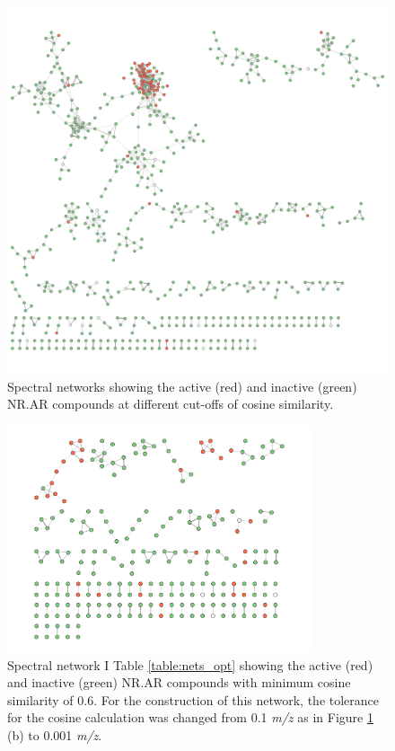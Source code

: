 \begin{figure}[H]
\begin{minipage}[b]{0.6\textwidth}
    \includegraphics[width=\textwidth]{include/img/appendix/nets_opt/NR.AR_cos0.1bin_min0.5_10link.pdf}
  \end{minipage}
  \caption{Spectral networks showing the active (red) and inactive (green) NR.AR compounds at different cut-offs of cosine similarity.}
  \label{fig:net_01_opt}
\end{figure}






\begin{figure}[H]
	\centering
  \includegraphics[width=0.8\textwidth]{include/img/appendix/nets_opt/NR.AR_cos0.001bin_min0.6_10link.pdf}
  \caption{Spectral network I Table \ref{table:nets_opt} showing the active (red) and inactive (green) NR.AR compounds with minimum cosine similarity of 0.6. For the construction of this network, the tolerance for the cosine calculation was changed from 0.1 \textit{m/z} as in Figure \ref{fig:net_01_opt} (b) to 0.001 \textit{m/z}.}
  \label{fig:net_0001}
\end{figure}






